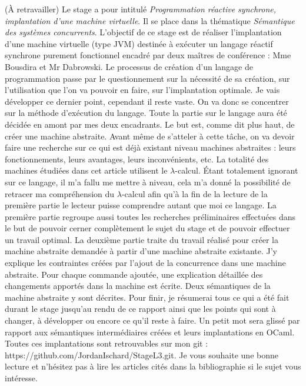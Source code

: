 \documentclass[10pt,a4paper]{report}
\begin{document}
(À retravailler)
Le stage a pour intitulé \textit{Programmation réactive synchrone, implantation d’une machine virtuelle}. Il se place dans la thématique
\textit{Sémantique des systèmes concurrents}. L’objectif de ce stage est de réaliser l’implantation d’une machine virtuelle (type JVM) destinée
à exécuter un langage réactif synchrone purement fonctionnel encadré par deux maîtres de conférence : Mme Bousdira et Mr Dabrowski.
\smallbreak
Le processus de création d'un langage de programmation passe par le questionnement sur la nécessité de sa création, sur l'utilisation que
l'on va pouvoir en faire, sur l'implantation optimale. Je vais développer ce dernier point, cependant il reste vaste. On va donc se concentrer
sur la méthode d'exécution du langage. Toute la partie sur le langage aura été décidée en amont par mes deux encadrants.
\smallbreak
Le but est, comme dit plus haut, de créer une machine abstraite. Avant même de s'atteler à cette tâche, on va devoir faire une recherche sur ce
qui est déjà existant niveau machines abstraites : leurs fonctionnements, leurs avantages, leurs inconvénients, etc. La totalité des machines étudiées
dans cet article utilisent le $\lambda$-calcul. Étant totalement ignorant sur ce langage, il m'a fallu me mettre à niveau, cela m'a donné la
possibilité de retracer ma compréhension du $\lambda$-calcul afin qu'à la fin de la lecture de la première partie le lecteur puisse comprendre autant
que moi ce langage. La première partie regroupe aussi toutes les recherches préliminaires effectuées dans le but de pouvoir cerner complètement le sujet
du stage et de pouvoir effectuer un travail optimal.
\smallbreak
La deuxième partie traite du travail réalisé pour créer la machine abstraite demandée à partir d'une machine abstraite existante. J'y explique les contraintes créées par l'ajout de la concurrence dans une machine abstraite. Pour chaque commande ajoutée, une explication détaillée des changements apportés dans la machine est écrite. Deux sémantiques de la machine abstraite y sont décrites.
\smallbreak
Pour finir, je résumerai tous ce qui a été fait durant le stage jusqu'au rendu de ce rapport ainsi que les points qui sont à changer, à développer ou encore ce qu'il reste à faire. Un petit mot sera glissé par rapport aux sémantiques intermédiaires créées et leurs implantations en OCaml. Toutes ces implantations sont retrouvables sur mon git : https://github.com/JordanIschard/StageL3.git.
\smallbreak
Je vous souhaite une bonne lecture et n'hésitez pas à lire les articles cités dans la bibliographie si le sujet vous intéresse.
\newpage
\end{document}
